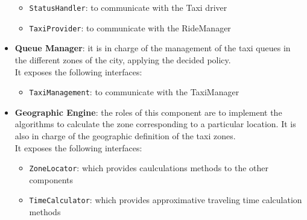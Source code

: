 \begin{itemize}
	\begin{itemize}
		\item \texttt{StatusHandler}: to communicate with the Taxi driver
		\item \texttt{TaxiProvider}: to communicate with the RideManager
	\end{itemize}
	\item \textbf{Queue Manager}: it is in charge of the management of the taxi queues in the different zones of the city, applying the decided policy.\\
	It exposes the following interfaces:
	\begin{itemize}
		\item \texttt{TaxiManagement}: to communicate with the TaxiManager
	\end{itemize}
	\item \textbf{Geographic Engine}: the roles of this component are to implement the algorithms to calculate the zone corresponding to a particular location. It is also in charge of the geographic definition of the taxi zones.\\It exposes the following interfaces:
	\begin{itemize}
		\item \texttt{ZoneLocator}: which provides caulculations methods to the other components
		\item \texttt{TimeCalculator}: which provides approximative traveling time calculation methods
	\end{itemize}
\end{itemize}